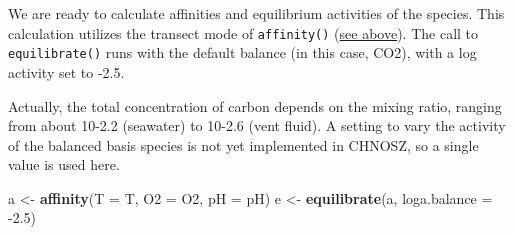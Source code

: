 \documentclass[]{tufte-book}
\newenvironment{Shaded}{}{}
\newcommand{\KeywordTok}[1]{\textcolor[rgb]{0.00,0.44,0.13}{\textbf{#1}}}
\newcommand{\DataTypeTok}[1]{\textcolor[rgb]{0.56,0.13,0.00}{#1}}
\newcommand{\DecValTok}[1]{\textcolor[rgb]{0.25,0.63,0.44}{#1}}
\newcommand{\FloatTok}[1]{\textcolor[rgb]{0.25,0.63,0.44}{#1}}
\newcommand{\StringTok}[1]{\textcolor[rgb]{0.25,0.44,0.63}{#1}}
\newcommand{\OperatorTok}[1]{\textcolor[rgb]{0.40,0.40,0.40}{#1}}
\newcommand{\NormalTok}[1]{#1}
\begin{document}
\begin{Shaded}
\end{Shaded}

We are ready to calculate affinities and equilibrium activities of the
species. This calculation utilizes the transect mode of
{\texttt{affinity()}} (\protect\hyperlink{t-p-activity-transects}{see
above}). The call to {\texttt{equilibrate()}} runs with the default
balance (in this case, CO2), with a log activity set to -2.5.

\begin{marginfigure}
Actually, the total concentration of carbon depends on the mixing ratio,
ranging from about 10-2.2 (seawater) to 10-2.6 (vent fluid). A setting
to vary the activity of the balanced basis species is not yet
implemented in CHNOSZ, so a single value is used here.
\end{marginfigure}

\begin{Shaded}
\begin{Highlighting}[]
\NormalTok{a <-}\StringTok{ }\KeywordTok{affinity}\NormalTok{(}\DataTypeTok{T =}\NormalTok{ T, }\DataTypeTok{O2 =}\NormalTok{ O2, }\DataTypeTok{pH =}\NormalTok{ pH)}
\NormalTok{e <-}\StringTok{ }\KeywordTok{equilibrate}\NormalTok{(a, }\DataTypeTok{loga.balance =} \OperatorTok{-}\FloatTok{2.5}\NormalTok{)}
\end{Highlighting}
\end{Shaded}
\end{document}
